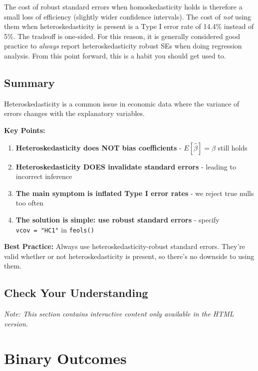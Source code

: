 \documentclass[
  letterpaper,
  DIV=11,
  numbers=noendperiod]{scrreprt}
\providecommand{\tightlist}{%
  \setlength{\itemsep}{0pt}\setlength{\parskip}{0pt}}
\begin{document}
The cost of robust standard errors when homoskedasticity holds is
therefore a small loss of efficiency (slightly wider confidence
intervals). The cost of \emph{not} using them when heteroskedasticity is
present is a Type I error rate of 14.4\% instead of 5\%. The tradeoff is
one-sided. For this reason, it is generally considered good practice to
\emph{always} report heteroskedasticity robust SEs when doing regression
analysis. From this point forward, this is a habit you should get used
to.

\section{Summary}\label{summary-4}

Heteroskedasticity is a common issue in economic data where the variance
of errors changes with the explanatory variables.

\textbf{Key Points:}

\begin{enumerate}
\def\labelenumi{\arabic{enumi}.}
\tightlist
\item
  \textbf{Heteroskedasticity does NOT bias coefficients} -
  \(E[\hat{\beta}] = \beta\) still holds
\item
  \textbf{Heteroskedasticity DOES invalidate standard errors} - leading
  to incorrect inference
\item
  \textbf{The main symptom is inflated Type I error rates} - we reject
  true nulls too often
\item
  \textbf{The solution is simple: use robust standard errors} - specify
  \texttt{vcov\ =\ "HC1"} in \texttt{feols()}
\end{enumerate}

\textbf{Best Practice:} Always use heteroskedasticity-robust standard
errors. They're valid whether or not heteroskedasticity is present, so
there's no downside to using them.

\section{Check Your Understanding}\label{check-your-understanding-7}

\emph{Note: This section contains interactive content only available in
the HTML version.}


\chapter{Binary Outcomes}\label{sec-binary-outcomes}
\end{document}

